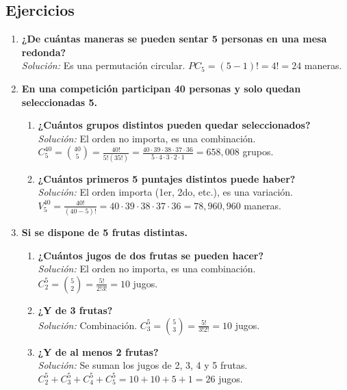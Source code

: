 \documentclass[12pt, letterpaper]{article}
\begin{document}
\subsection{Ejercicios}
\begin{enumerate}
    \item \textbf{¿De cuántas maneras se pueden sentar 5 personas en una mesa redonda?} \\
    \textit{Solución:} Es una permutación circular. $PC_5 = (5-1)! = 4! = 24$ maneras.

    \item \textbf{En una competición participan 40 personas y solo quedan seleccionadas 5.}
        \begin{enumerate}
            \item \textbf{¿Cuántos grupos distintos pueden quedar seleccionados?} \\
            \textit{Solución:} El orden no importa, es una combinación. \\
            $C_5^{40} = \binom{40}{5} = \frac{40!}{5!(35!)} = \frac{40 \cdot 39 \cdot 38 \cdot 37 \cdot 36}{5 \cdot 4 \cdot 3 \cdot 2 \cdot 1} = 658,008$ grupos.
            \item \textbf{¿Cuántos primeros 5 puntajes distintos puede haber?} \\
            \textit{Solución:} El orden importa (1er, 2do, etc.), es una variación. \\
            $V_5^{40} = \frac{40!}{(40-5)!} = 40 \cdot 39 \cdot 38 \cdot 37 \cdot 36 = 78,960,960$ maneras.
        \end{enumerate}

    \item \textbf{Si se dispone de 5 frutas distintas.}
        \begin{enumerate}
            \item \textbf{¿Cuántos jugos de dos frutas se pueden hacer?} \\
            \textit{Solución:} El orden no importa, es una combinación. \\
            $C_2^5 = \binom{5}{2} = \frac{5!}{2!3!} = 10$ jugos.
            \item \textbf{¿Y de 3 frutas?} \\
            \textit{Solución:} Combinación. $C_3^5 = \binom{5}{3} = \frac{5!}{3!2!} = 10$ jugos.
            \item \textbf{¿Y de al menos 2 frutas?} \\
            \textit{Solución:} Se suman los jugos de 2, 3, 4 y 5 frutas. \\
            $C_2^5 + C_3^5 + C_4^5 + C_5^5 = 10 + 10 + 5 + 1 = 26$ jugos.
        \end{enumerate}
\end{enumerate}
\end{document}
